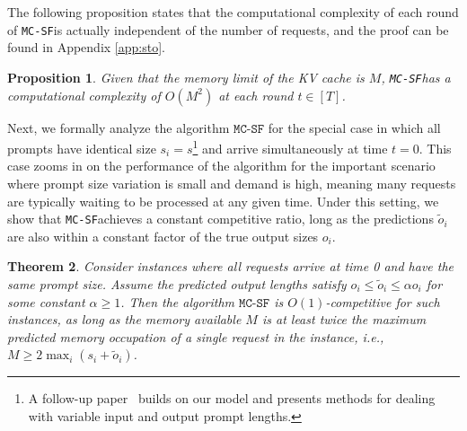 \documentclass[11pt, a4paper]{article}
\theoremstyle{plain}
\newtheorem{theorem}{Theorem}[section]
\newtheorem{proposition}[theorem]{Proposition}
\theoremstyle{definition}
\theoremstyle{remark}
\newcommand{\mcsdf}{\texttt{MC-SF}}
\newcommand{\alg}{\mcsdf}
\newcommand{\po}{\tilde{o}}
\begin{document}
The following proposition states that the computational complexity of each round of \mcsdf \text{ }is actually independent of the number of requests, and the proof can be found in Appendix \ref{app:sto}. 

\begin{proposition}\label{thm:complexity}
    Given that the memory limit of the KV cache is $M$, \mcsdf \text{ }has a computational complexity of $O(M^2)$ at each round $t \in [T]$. 
\end{proposition}

Next, we formally analyze the algorithm $\alg$ for the special case in which all prompts have identical size $s_i = s$\footnote{{A follow-up paper~\citep{wang2025llm} builds on our model and presents methods for dealing with variable input and output prompt lengths.}} and arrive simultaneously at time $t = 0$. This case zooms in on the performance of the algorithm for the important scenario where prompt size variation is small and demand is high, meaning many requests are typically waiting to be processed at any given time. 
Under this setting, we show that \mcsdf \text{ }achieves a constant competitive ratio, long as the predictions $\po_i$ are also within a constant factor of the true output sizes $o_i$.

\begin{theorem}	\label{thm:main}
    Consider instances where all requests arrive at time 0 and have the same prompt size. {Assume the predicted output lengths satisfy $o_i \le \po_i \le \alpha o_i$ for some constant $\alpha \ge 1$}. Then the algorithm $\alg$ is $O(1)$-competitive for such instances, as long as the memory available $M$ is at least twice the maximum predicted memory occupation of a single request in the instance, i.e., $M \ge 2 \max_i (s_i + \po_i)$. 
\end{theorem}
\end{document}
